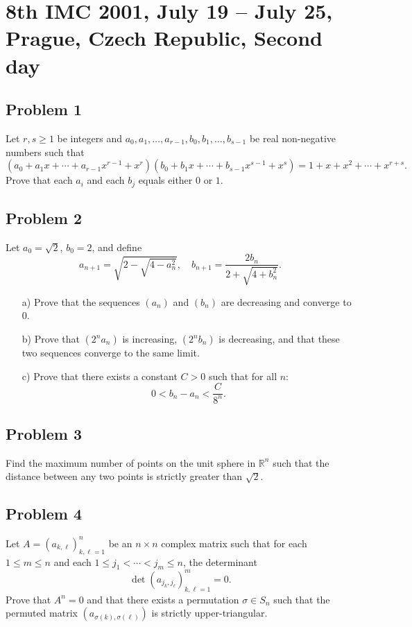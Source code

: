 \documentclass{article}
\begin{document}
\pagestyle{plain}

\section*{8th IMC 2001, July 19 -- July 25, Prague, Czech Republic, Second day}

\subsection*{Problem 1}
Let $r, s \geq 1$ be integers and $a_0, a_1, \dots, a_{r-1}, b_0, b_1, \dots, b_{s-1}$ be real non-negative numbers such that
\[
(a_0 + a_1x + \cdots + a_{r-1}x^{r-1} + x^r)(b_0 + b_1x + \cdots + b_{s-1}x^{s-1} + x^s) = 1 + x + x^2 + \cdots + x^{r+s}.
\]
Prove that each $a_i$ and each $b_j$ equals either $0$ or $1$.

\subsection*{Problem 2}
Let $a_0 = \sqrt{2}$, $b_0 = 2$, and define
\[
a_{n+1} = \sqrt{2 - \sqrt{4 - a_n^2}}, \quad
b_{n+1} = \frac{2b_n}{2 + \sqrt{4 + b_n^2}}.
\]
\begin{itemize}
    \item[a)] Prove that the sequences $(a_n)$ and $(b_n)$ are decreasing and converge to $0$.
    \item[b)] Prove that $(2^n a_n)$ is increasing, $(2^n b_n)$ is decreasing, and that these two sequences converge to the same limit.
    \item[c)] Prove that there exists a constant $C>0$ such that for all $n$:
\[
0 < b_n - a_n < \frac{C}{8^n}.
\]
\end{itemize}

\subsection*{Problem 3}
Find the maximum number of points on the unit sphere in $\mathbb{R}^n$ such that
the distance between any two points is strictly greater than $\sqrt{2}$.

\subsection*{Problem 4}
Let $A = (a_{k,\ell})_{k,\ell=1}^n$ be an $n \times n$ complex matrix such that for each $1 \leq m \leq n$ and each $1 \leq j_1 < \cdots < j_m \leq n$, the determinant
\[
\det(a_{j_k, j_\ell})_{k,\ell=1}^m = 0.
\]
Prove that $A^n = 0$ and that there exists a permutation $\sigma \in S_n$ such that the permuted matrix $(a_{\sigma(k), \sigma(\ell)})$ is strictly upper-triangular.
\end{document}
